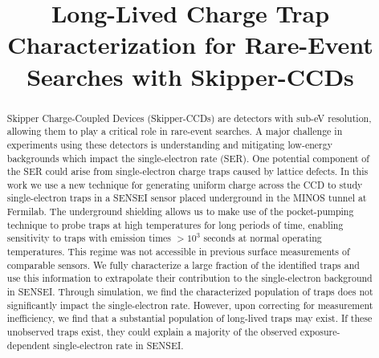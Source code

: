 \documentclass[aps, prapplied,twocolumn,showpacs,superscriptaddress,preprintnumbers, longbibliography,nofootinbib,floatfix]{revtex4-2}
\begin{document}
\preprint{}

\title{Long-Lived Charge Trap Characterization for Rare-Event Searches with Skipper-CCDs}



\begin{abstract}
\noindent Skipper Charge-Coupled Devices (Skipper-CCDs) are detectors with sub-eV resolution, allowing them to play a critical role in rare-event searches. 
A major challenge in experiments using these detectors is understanding and mitigating low-energy backgrounds which impact the single-electron rate (SER). 
One potential component of the SER could arise from single-electron charge traps caused by lattice defects. 
In this work we use a new technique for generating uniform charge across the CCD to study single-electron traps in a SENSEI sensor placed underground in the MINOS tunnel at Fermilab. 
The underground shielding allows us to make use of the pocket-pumping technique to probe traps at high temperatures for long periods of time, enabling sensitivity to traps with emission times $>10^3$ seconds at normal operating temperatures. 
This regime was not accessible in previous surface measurements of comparable sensors.
We fully characterize a large fraction of the identified traps and use this information to extrapolate their contribution to the single-electron background in SENSEI.
Through simulation, we find the characterized population of traps does not significantly impact the single-electron rate.
However, upon correcting for measurement inefficiency, we find that a substantial population of long-lived traps may exist.
If these unobserved traps exist, they could explain a majority of the observed exposure-dependent single-electron rate in SENSEI.


\end{abstract}

\maketitle
\end{document}
